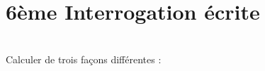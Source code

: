 


\pagestyle{empty}
\section*{6ème Interrogation écrite}

\\
Calculer de trois fa\c{c}ons différentes :\\
[Contenu fractions...]
